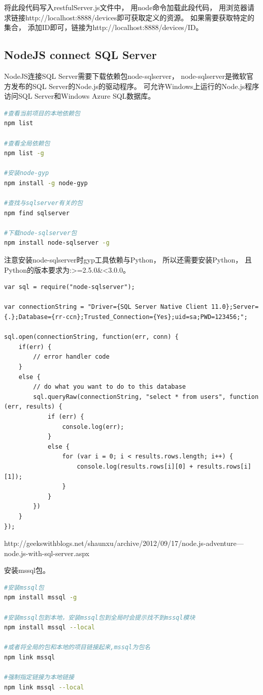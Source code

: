 \documentclass{book}
\begin{document}
将此段代码写入restfulServer.js文件中，
用node命令加载此段代码，
用浏览器请求链接http://localhost:8888/devices即可获取定义的资源。
如果需要获取特定的集合，
添加ID即可，链接为http://localhost:8888/devices/{ID}。

\subsection{NodeJS connect SQL Server}

NodeJS连接SQL Server需要下载依赖包node-sqlserver，
node-sqlserver是微软官方发布的SQL Server的Node.js的驱动程序。
可允许Windows上运行的Node.js程序访问SQL Server和Windows Azure SQL数据库。

\begin{lstlisting}[language=Bash]
#查看当前项目的本地依赖包
npm list

#查看全局依赖包
npm list -g 

#安装node-gyp
npm install -g node-gyp

#查找与sqlserver有关的包
npm find sqlserver

#下载node-sqlserver包
npm install node-sqlserver -g
\end{lstlisting}

注意安装node-sqlserver时gyp工具依赖与Python，
所以还需要安装Python，
且Python的版本要求为:>=2.5.0\&<3.0.0。

\begin{lstlisting}[language=VBScript]
var sql = require("node-sqlserver");

var connectionString = "Driver={SQL Server Native Client 11.0};Server={.};Database={rr-ccn};Trusted_Connection={Yes};uid=sa;PWD=123456;";

sql.open(connectionString, function(err, conn) {
    if(err) {
        // error handler code
    }
    else {
        // do what you want to do to this database
        sql.queryRaw(connectionString, "select * from users", function (err, results) {
            if (err) {
                console.log(err);
            }
            else {
                for (var i = 0; i < results.rows.length; i++) {
                    console.log(results.rows[i][0] + results.rows[i][1]);
                }
            }
        })
    }
});
\end{lstlisting}

http://geekswithblogs.net/shaunxu/archive/2012/09/17/node.js-adventure---node.js-with-sql-server.aspx

安装mssql包。

\begin{lstlisting}[language=Bash,caption=npm操作脚本]
#安装mssql包
npm install mssql -g

#安装mssql包到本地，安装mssql包到全局时会提示找不到mssql模块
npm install mssql --local

#或者将全局的包和本地的项目链接起来,mssql为包名
npm link mssql

#强制指定链接为本地链接
npm link mssql --local
\end{lstlisting}
\end{document}

